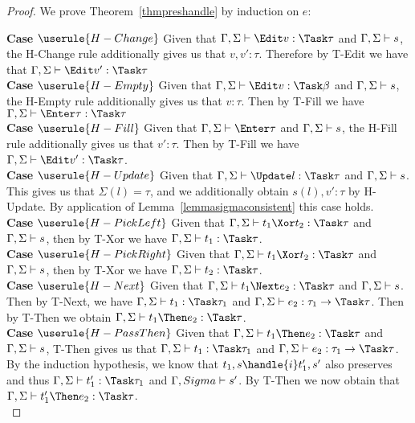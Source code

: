 \begin{proof}
  We prove Theorem~\ref{thmpreshandle} by induction on $e$:

  \noindent\textbf{Case} $\userule{H-Change}$ Given that $\Gamma,\Sigma\infers\Edit v:\Task\tau$ and $\Gamma,\Sigma\vdash s$, the H-Change rule additionally gives us that $v,v':\tau$. Therefore by T-Edit we have that $\Gamma,\Sigma\infers\Edit v':\Task\tau$\\

  \noindent\textbf{Case} $\userule{H-Empty}$ Given that $\Gamma,\Sigma\infers\Edit v:\Task\beta$ and $\Gamma,\Sigma\vdash s$, the H-Empty rule additionally gives us that $v:\tau$. Then by T-Fill we have $\Gamma,\Sigma\infers\Enter \tau:\Task\tau$ \\

  \noindent\textbf{Case} $\userule{H-Fill}$ Given that $\Gamma,\Sigma\infers\Enter\tau$ and $\Gamma,\Sigma\vdash s$, the H-Fill rule additionally gives us that $v':\tau$. Then by T-Fill we have $\Gamma,\Sigma\infers \Edit v':\Task\tau$.\\

  \noindent\textbf{Case} $\userule{H-Update}$ Given that $\Gamma,\Sigma\infers\Update l:\Task\tau$ and $\Gamma,\Sigma\vdash s$. This gives us that $\Sigma(l)=\tau$, and we additionally obtain $s(l),v':\tau$ by H-Update. By application of Lemma~\ref{lemmasigmaconsistent} this case holds.\\

  \noindent\textbf{Case} $\userule{H-PickLeft}$ Given that $\Gamma,\Sigma\infers t_1\Xor t_2:\Task\tau$ and $\Gamma,\Sigma\vdash s$, then by T-Xor we have $\Gamma,\Sigma\infers t_1:\Task \tau$.\\

  \noindent\textbf{Case} $\userule{H-PickRight}$ Given that $\Gamma,\Sigma\infers t_1\Xor t_2:\Task\tau$ and $\Gamma,\Sigma\vdash s$, then by T-Xor we have $\Gamma,\Sigma\infers t_2:\Task \tau$. \\

  \noindent\textbf{Case} $\userule{H-Next}$ Given that $\Gamma,\Sigma\infers t_1\Next e_2 :\Task\tau$ and $\Gamma,\Sigma\vdash s$. Then by T-Next, we have $\Gamma,\Sigma\infers t_1:\Task\tau_1$ and $\Gamma,\Sigma\infers e_2:\tau_1\to\Task\tau$. Then by T-Then we obtain $\Gamma,\Sigma\infers t_1\Then e_2:\Task\tau$.\\

  \noindent\textbf{Case} $\userule{H-PassThen}$ Given that $\Gamma,\Sigma\infers t_1\Then e_2:\Task\tau$ and $\Gamma,\Sigma\vdash s$, T-Then gives us that $\Gamma,\Sigma\infers t_1:\Task\tau_1$ and $\Gamma,\Sigma\infers e_2:\tau_1\to\Task\tau$. By the induction hypothesis, we know that $t_1,s\handle{i}t_1',s'$ also preserves and thus $\Gamma,\Sigma\infers t_1':\Task\tau_1$ and $\Gamma,Sigma\vdash s'$. By T-Then we now obtain that $\Gamma,\Sigma\infers t_1'\Then e_2:\Task\tau$. \\


\end{proof}
